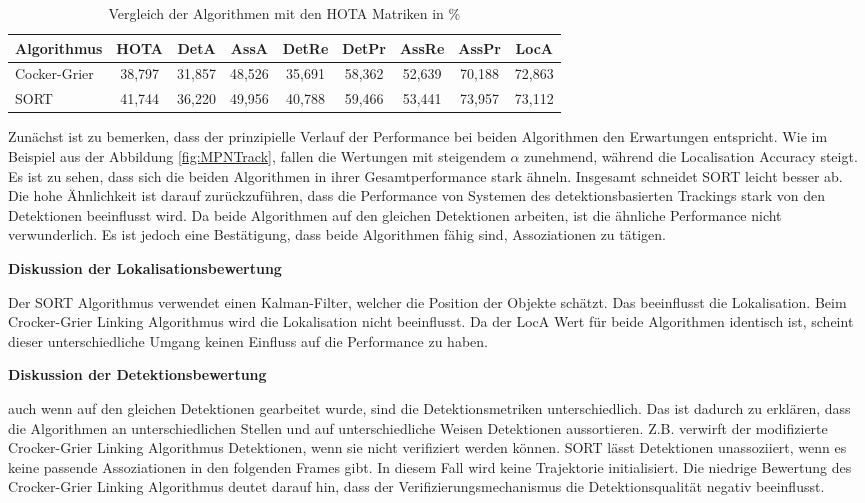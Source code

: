 \begin{table}[htbp]
\centering
\caption{Vergleich der Algorithmen mit den HOTA Matriken in \%}
\label{tab:verglHOTA}
\begin{tabular}{
  l
  S[table-format=2.3]
  S[table-format=2.3]
  S[table-format=2.3]
  S[table-format=2.3]
  S[table-format=2.3]
  S[table-format=2.3]
  S[table-format=2.3]
  S[table-format=2.3]
}
\toprule
{Algorithmus} & {HOTA} & {DetA} & {AssA} & {DetRe} & {DetPr} & {AssRe} & {AssPr} & {LocA} \\
\midrule
Cocker-Grier  & 38,797 & 31,857 & 48,526 & 35,691  & 58,362  & 52,639  & 70,188  & 72,863 \\
SORT          & 41,744 & 36,220 & 49,956 & 40,788  & 59,466  & 53,441  & 73,957  & 73,112 \\
\bottomrule
\end{tabular}
\end{table}

Zunächst ist zu bemerken, dass der prinzipielle Verlauf der Performance bei beiden Algorithmen den Erwartungen entspricht. Wie im Beispiel aus der Abbildung \ref{fig:MPNTrack}, fallen die Wertungen mit steigendem \(\alpha\) zunehmend, während die Localisation Accuracy steigt. Es ist zu sehen, dass sich die beiden Algorithmen in ihrer Gesamtperformance stark ähneln. Insgesamt schneidet SORT leicht besser ab. Die hohe Ähnlichkeit ist darauf zurückzuführen, dass die Performance von Systemen des detektionsbasierten Trackings stark von den Detektionen beeinflusst wird. Da beide Algorithmen auf den gleichen Detektionen arbeiten, ist die ähnliche Performance nicht verwunderlich. Es ist jedoch eine Bestätigung, dass beide Algorithmen fähig sind, Assoziationen zu tätigen.\dubpar

\textbf{Diskussion der Lokalisationsbewertung}\par
Der SORT Algorithmus verwendet einen Kalman-Filter, welcher die Position der Objekte schätzt. Das beeinflusst die Lokalisation. Beim Crocker-Grier Linking Algorithmus wird die Lokalisation nicht beeinflusst. Da der LocA Wert für beide Algorithmen identisch ist, scheint dieser unterschiedliche Umgang keinen Einfluss auf die Performance zu haben.\dubpar

\textbf{Diskussion der Detektionsbewertung}\par
auch wenn auf den gleichen Detektionen gearbeitet wurde, sind die Detektionsmetriken unterschiedlich. Das ist dadurch zu erklären, dass die Algorithmen an unterschiedlichen Stellen und auf unterschiedliche Weisen Detektionen aussortieren. Z.B. verwirft der modifizierte Crocker-Grier Linking Algorithmus Detektionen, wenn sie nicht verifiziert werden können. SORT lässt Detektionen unassoziiert, wenn es keine passende Assoziationen in den folgenden Frames gibt. In diesem Fall wird keine Trajektorie initialisiert. Die niedrige Bewertung des Crocker-Grier Linking Algorithmus deutet darauf hin, dass der Verifizierungsmechanismus die Detektionsqualität negativ beeinflusst. \par

